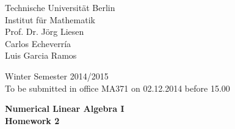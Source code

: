 \documentclass[10pt]{report}
\begin{document}
\begin{minipage}[t]{0.58\textwidth}
Technische Universit\"at Berlin\\
Institut f\"ur Mathematik\\
Prof. Dr. J\"org Liesen\\
Carlos Echeverr\'ia\\
Luis Garcia Ramos
\end{minipage}
\hfill
\begin{minipage}[t]{0.48\textwidth}
\begin{flushright}
Winter Semester 2014/2015\\
To be submitted in office MA371 on 02.12.2014 before 15.00
\end{flushright}
\end{minipage}
\begin{center}
\textbf{{Numerical Linear Algebra I}}\\
\textbf{Homework 2}
\end{center}

\thispagestyle{empty}
\vspace{0cm} 
\end{document}
